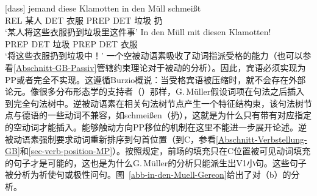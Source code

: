 \begin{exe}
\begin{xlist}[iv.]
\begin{exe}
\begin{xlist}[iv.]
\eal
\ex 
\gll {}[dass] jemand diese Klamotten in den Müll schmeißt\\
     {}\spacebr{}REL 某人 DET 衣服 PREP DET 垃圾 扔\\
\glt `某人将这些衣服扔到垃圾里这件事'     
\ex\label{in-den-Muell-mit} 
\gll In den Müll mit diesen Klamotten!\\
     PREP DET 垃圾 PREP DET 衣服\\
\glt `将这些衣服扔到垃圾中！'
\zl
一个空被动语素吸收了动词指派受格的能力（也可以参看\ref{Abschnitt-GB-Passiv}管辖约束理论对于被动的分析）。因此，宾语必须实现为PP或者完全不实现。这遵循Burzio概说：当受格宾语被压缩时，就不会存在外部论元。像很多分布形态学的支持者（\egc \citealp{Marantz97a}）那样，G.\,Müller假设词项在句法之后插入到完全句法树中。逆被动语素在相关句法树节点产生一个特征结构束，该句法树节点与德语的一些动词不兼容，如schmeißen（扔），这就是为什么只有带有对应指定的空动词才能插入。能够触动方向PP移位的机制在这里不能进一步展开论述。逆被动语素强制要求动词重新排序到句首位置（到C，参看\ref{Abschnitt-Verbstellung-GB}和\ref{sec-verb-position-MP}）。按照规定，前场的填充只在C位置被可见动词填充的句子才是可能的，这也是为什么G.\,Müller的分析只能派生出V1小句。这些句子被分析为祈使句或极性问句。图~\vref{abb-in-den-Muell-Gereon}给出了对（b）的分析。

\end{xlist}
\end{exe}
\end{xlist}
\end{exe}
